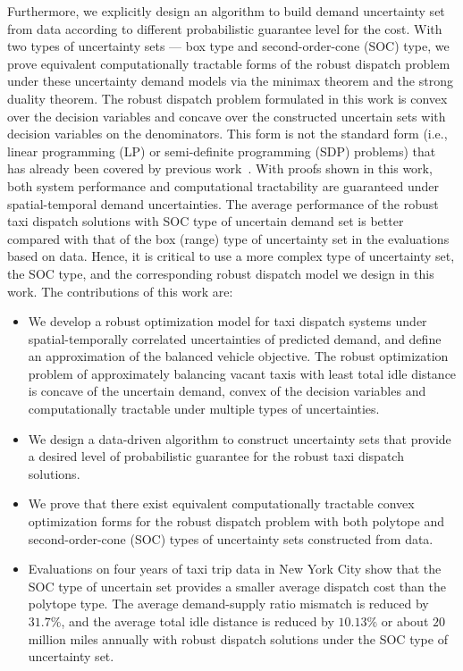 \documentclass[10pt,twocolumn,twoside,english]{IEEEtran}
\begin{document}
Furthermore, we explicitly design an algorithm to build demand uncertainty set from data according to different probabilistic guarantee level for the cost. With two types of uncertainty sets --- box type and second-order-cone (SOC) type, we prove equivalent computationally tractable forms of the robust dispatch problem under these uncertainty demand models via the minimax theorem and the strong duality theorem. The robust dispatch problem formulated in this work is convex over the decision variables and concave over the constructed uncertain sets with decision variables on the denominators. This form is not the standard form (i.e., linear programming (LP) or semi-definite programming (SDP) problems) that has already been covered by previous work~\cite{robustconvex, datad_robust, robust_mpc}. With proofs shown in this work, both system performance and computational tractability are guaranteed under spatial-temporal demand uncertainties. The average performance of the robust taxi dispatch solutions with SOC type of uncertain demand set is better compared with that of the box (range) type of uncertainty set in the evaluations based on data. Hence, it is critical to use a more complex type of uncertainty set, the SOC type, and the corresponding robust dispatch model we design in this work. The contributions of this work are:
\begin{itemize}
\item We develop a robust optimization model for taxi dispatch systems under spatial-temporally correlated uncertainties of predicted demand, and define an approximation of the balanced vehicle objective. The robust optimization problem of approximately balancing vacant taxis with least total idle distance is concave of the uncertain demand, convex of the decision variables and computationally tractable under multiple types of uncertainties. 
\item We design a data-driven algorithm to construct uncertainty sets that provide a desired level of probabilistic guarantee for the robust taxi dispatch solutions. 
\item We prove that there exist equivalent computationally tractable convex optimization forms for the robust dispatch problem with both polytope and second-order-cone (SOC) types of  uncertainty sets constructed from data.
\item  Evaluations on four years of taxi trip data in New York City show that the SOC type of uncertain set provides a smaller average dispatch cost than the polytope type. The average demand-supply ratio mismatch is reduced by $31.7\%$, and the average total idle distance is reduced by $10.13\%$ or about $20$ million miles annually with robust dispatch solutions under the SOC type of uncertainty set.
\end{itemize}
\end{document}
